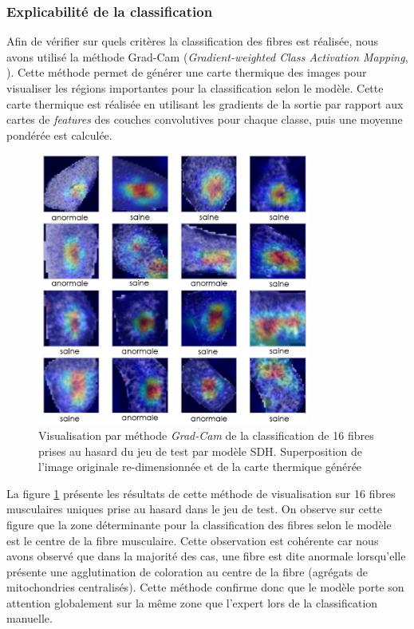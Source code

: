 \subsubsection{Explicabilité de la classification}
Afin de vérifier sur quels critères la classification des fibres est réalisée, nous avons utilisé la méthode Grad-Cam (\textit{Gradient-weighted Class Activation Mapping}, \cite{selvaraju_grad-cam_2020}). Cette méthode permet de générer une carte thermique des images pour visualiser les régions importantes pour la classification selon le modèle. Cette carte thermique est réalisée en utilisant les gradients de la sortie par rapport aux cartes de \textit{features} des couches convolutives pour chaque classe, puis une moyenne pondérée est calculée.

\begin{figure}[htbp]
 \centering
 \includegraphics[width=0.8\textwidth]{figures/sdh_gradcam.png}
 \caption[Visualisation par méthode \textit{Grad-Cam} du modèle SDH]{Visualisation par méthode  \textit{Grad-Cam} de la classification de 16 fibres prises au hasard du jeu de test par modèle SDH. Superposition de l'image originale re-dimensionnée et de la carte thermique générée}
 \label{fig:gradcam_sdh}
\end{figure}
La figure \ref{fig:gradcam_sdh} présente les résultats de cette méthode de visualisation sur 16 fibres musculaires uniques prise au hasard dans le jeu de test. On observe sur cette figure que la zone déterminante pour la classification des fibres selon le modèle est le centre de la fibre musculaire. Cette observation est cohérente car nous avons observé que dans la majorité des cas, une fibre est dite anormale lorsqu'elle présente une agglutination de coloration au centre de la fibre (agrégats de mitochondries centralisés). Cette méthode confirme donc que le modèle porte son attention globalement sur la même zone que l'expert lors de la classification manuelle. 

